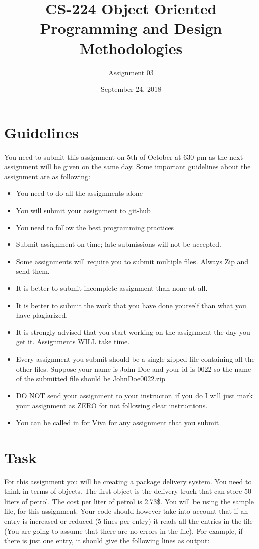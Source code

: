\documentclass[a4paper,12pt]{article}
\begin{document}
	
	\title{CS-224 Object Oriented Programming and Design Methodologies }
	\author{Assignment 03}
	\date{September 24, 2018}
	\maketitle
	\section{Guidelines}
	You need to submit this assignment on  {\color{red}5th of October at 630 pm } as the next assignment will be given on the same day. Some important guidelines about the assignment are as following:
	
	\begin{itemize}
		\item You need to do all the assignments alone
		\item You will submit your assignment to git-hub 
		\item You need to follow the best programming practices 
		\item Submit assignment on time; late submissions will not be accepted.
		\item Some assignments will require you to submit multiple files. Always Zip and send them.
		\item It is better to submit incomplete assignment than none at all.
		\item It is better to submit the work that you have done yourself than what you have plagiarized.
		\item It is strongly advised that you start working on the assignment the day you get it. Assignments WILL take time.
		\item Every assignment you submit should be a single zipped file containing all the other files. Suppose your name is John Doe and your id is 0022 so the name of the submitted file should be JohnDoe0022.zip
		\item DO NOT send your assignment to your instructor, if you do I will just mark your assignment as ZERO for not following clear instructions.
		\item You can be called in for Viva for any assignment that you submit
	\end{itemize}
	
	\section{Task}
	For this assignment you will be creating a package delivery system. You need to think in terms of objects.	The first object is the delivery truck that can store 50 liters of petrol. The cost per liter of petrol is 2.73\$.	You will be using the sample file,  for this assignment. Your code should however take into account that if an entry is increased or reduced (5 lines per entry) it reads all the entries in the file (You are going to assume that there are no errors in the file). For example, if there is just one entry, it should give the following lines as output:\smallskip\\
	
\end{document}
